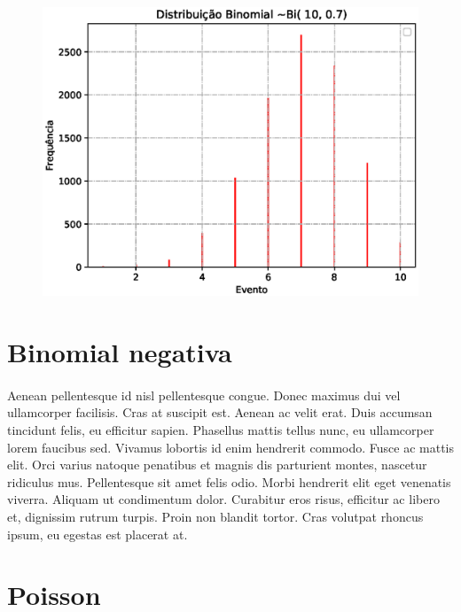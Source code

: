 \documentclass[a4paper,12pt]{article}
\begin{document}
\begin{figure}[h!]
  \begin{center}
    \includegraphics[scale=0.41]{binomial1007.eps}
  \end{center}
\end{figure}

\section{Binomial negativa}

\paragraph{}
Aenean pellentesque id nisl pellentesque congue. Donec maximus dui vel
ullamcorper facilisis. Cras at suscipit est. Aenean ac velit
erat. Duis accumsan tincidunt felis, eu efficitur sapien. Phasellus
mattis tellus nunc, eu ullamcorper lorem faucibus sed. Vivamus
lobortis id enim hendrerit commodo. Fusce ac mattis elit. Orci varius
natoque penatibus et magnis dis parturient montes, nascetur ridiculus
mus. Pellentesque sit amet felis odio. Morbi hendrerit elit eget
venenatis viverra. Aliquam ut condimentum dolor. Curabitur eros risus,
efficitur ac libero et, dignissim rutrum turpis. Proin non blandit
tortor. Cras volutpat rhoncus ipsum, eu egestas est placerat at.

\section{Poisson}
\end{document}

